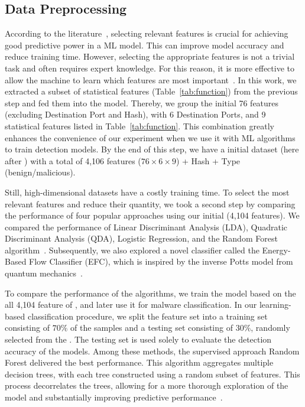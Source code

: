 \subsection{Data Preprocessing}\label{sec:set}


According to the literature~\cite{DBLP:conf/ichmi/Xie22,DBLP:journals/mta/AmiriebrahimabadiM24}, selecting relevant features is crucial for achieving good predictive power in a ML model. This can improve model accuracy and reduce training time. However, selecting the appropriate features is not a trivial task and often requires expert knowledge. For this reason, it is more effective to allow the machine to learn which features are most important~\cite{DBLP:journals/spe/FallahB22}. In this work, we extracted a subset of statistical features (Table~\ref{tab:function}) from the previous step and fed them into the model. Thereby, we group the initial 76 features (excluding Destination Port and Hash), with 6 Destination Ports, and 9 statistical features listed in Table~\ref{tab:function}. This combination greatly enhances the convenience of our experiment when we use it with ML algorithms to train detection models. By the end of this step, we have a initial dataset (here after \fds) with a total of 4,106 features ($76\times6\times9$) + Hash + Type (benign/malicious).


Still, high-dimensional datasets have a costly training time. To select the most relevant features and reduce their quantity, we took a second step by comparing the performance of four popular approaches using our initial \fds (4,104 features). We compared the performance of Linear Discriminant Analysis (LDA), Quadratic Discriminant Analysis (QDA), Logistic Regression, and the Random Forest algorithm~\cite{james2023introduction}. Subsequently, we also explored a novel classifier called the Energy-Based Flow Classifier (EFC), which is inspired by the inverse Potts model from quantum mechanics~\cite{DBLP:journals/tnsm/PontesSGBM21}.


To compare the performance of the algorithms, we train the
model based on the all 4,104 feature of \fds, and later use it for malware classification. In our learning-based classification procedure,
we split the feature set into a training set consisting of $70\%$
of the samples and a testing set consisting of $30\%$, randomly
selected from the \fds. The testing set is used solely
to evaluate the detection accuracy of the models. Among these methods, the supervised approach Random Forest delivered the best performance. This algorithm aggregates multiple decision trees, with each tree constructed using a random subset of features. This process decorrelates the trees, allowing for a more thorough exploration of the model and substantially improving predictive performance~\cite{james2023introduction}.


